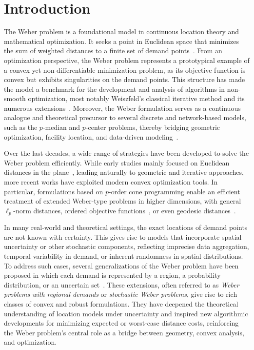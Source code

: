 \documentclass[letter,11pt, reqno]{amsart}
\renewcommand{\;}{\quad}
\theoremstyle{thmstyleone}%
\theoremstyle{thmstyletwo}%
\theoremstyle{thmstylethree}%
\begin{document}
\section{Introduction} \label{sec:intro}
The Weber problem is a foundational model in continuous location theory and mathematical optimization. It seeks a point in Euclidean space that minimizes the sum of weighted distances to a finite set of demand points~\citep{Weber1909,Love1988,Brimberg2003,chandrasekaran1990algebraic}. From an optimization perspective, the Weber problem represents a prototypical example of a convex yet non-differentiable minimization problem, as its objective function is convex but exhibits singularities on the demand points. This structure has made the model a benchmark for the development and analysis of algorithms in non-smooth optimization, most notably Weiszfeld’s classical iterative method and its numerous extensions~\citep{Weiszfeld1937,Brimberg1995}. Moreover, the Weber formulation serves as a continuous analogue and theoretical precursor to several discrete and network-based models, such as the $p$-median and $p$-center problems, thereby bridging geometric optimization, facility location, and data-driven modeling~\citep{DreznerHamacher2002,Small1990,Cardinal2009}. 

Over the last decades, a wide range of strategies have been developed to solve the Weber problem efficiently. While early studies mainly focused on Euclidean distances in the plane~\citep[see, e.g.,][]{Love1988,Brimberg2003}, leading naturally to geometric and iterative approaches, more recent works have exploited modern convex optimization tools. In particular, formulations based on $p$-order cone programming enable an efficient treatment of extended Weber-type problems in higher dimensions, with general $\ell_p$-norm distances, ordered objective functions~\citep{espejo2009convex,blanco2014revisiting}, or even geodesic distances~\citep{blanco2017continuous}.

In many real-world and theoretical settings, the exact locations of demand points are not known with certainty. This gives rise to models that incorporate spatial uncertainty or other stochastic components, reflecting imprecise data aggregation, temporal variability in demand, or inherent randomness in spatial distributions. To address such cases, several generalizations of the Weber problem have been proposed in which each demand is represented by a region, a probability distribution, or an uncertain set~\citep{carrizosa1995generalized,carrizosa1998weber,Krarup1978,DreznerWesolowsky1991,BrimbergDrezner2011,kalczynski2025weber}. These extensions, often referred to as \emph{Weber problems with regional demands} or \emph{stochastic Weber problems}, give rise to rich classes of convex and robust formulations. They have deepened the theoretical understanding of location models under uncertainty and inspired new algorithmic developments for minimizing expected or worst-case distance costs, reinforcing the Weber problem’s central role as a bridge between geometry, convex analysis, and optimization.
\end{document}
